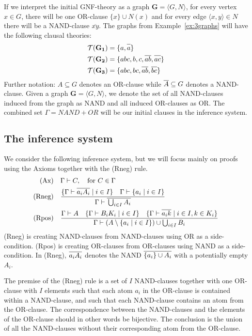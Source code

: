 If we interpret the initial GNF-theory as a graph $\mathbf{G}=\langle G,N\rangle$, for every vertex $x \in G$, there will be one OR-clause $\{ x \} \cup N(x)$ and for every edge $\langle x,y \rangle \in N$ there will be a NAND-clause $\overline{xy}$.
The graphs from Example~\ref{ex:3graphs} will have the following clausal theories:
\begin{align}
  \mathcal{T}(\mathbf{G_1}) &= \{ a, \ol{a} \}\\
  \mathcal{T}(\mathbf{G_2}) &= \{ abc, b, c, \ol{ab}, \ol{ac} \}\\
  \mathcal{T}(\mathbf{G_3}) &= \{ abc, bc, \ol{ab}, \ol{bc} \}
\end{align}
Further notation: $A\subseteq G$ denotes an OR-clause while $\ol{A} \subseteq G$ denotes a NAND-clause.
Given a graph $\mathbf{G}=\langle G,N\rangle$, we denote the set of all NAND-clauses induced from the graph as NAND and all induced OR-clauses as OR.
The combined set $\Gamma = NAND + OR$ will be our initial clauses in the inference system.
\subsection{The inference system}
\label{sub:The inference system}
We consider the following inference system, but we will focus mainly on proofs using the Axioms together with the (Rneg) rule.
\begin{align}
  \text{(Ax)} &\quad \Gamma \vdash C, \quad \text{for } C \in \Gamma\\
  \text{(Rneg)} &\quad \frac{ \{ \Gamma \vdash \ol{a_iA_i} \; |\; i \in I \} \quad \Gamma \vdash \{ a_i \; |\; i \in I \} }{ \Gamma \vdash \ol{\bigcup_{i \in I} A_i} }\\
  \text{(Rpos)} &\quad \frac{ \Gamma \vdash A \quad \{\Gamma \vdash B_iK_i \; |\; i \in I \} \quad \{ \Gamma \vdash \ol{a_ik} \; |\; i \in I, k \in K_i \} }{ \Gamma \vdash (A \setminus \{ a_i \; |\; i \in I \} ) \cup \bigcup_{i \in I} B_i }
\end{align}
(Rneg) is creating NAND-clauses from NAND-clauses using OR as a side-condition.
(Rpos) is creating OR-clauses from OR-clauses using NAND as a side-condition.
In (Rneg), $\ol{a_iA_i}$ denotes the NAND $\ol{\{ a_i \} \cup A_i}$ with a potentially empty $A_i$.

The premise of the (Rneg) rule is a set of $I$ NAND-clauses together with one OR-clause with $I$ elements such that each atom $a_i$ in the OR-clause is contained within a NAND-clause, and such that each NAND-clause contains an atom from the OR-clause.
The correspondence between the NAND-clauses and the elements of the OR-clause should in other words be bijective.
The conclusion is the union of all the NAND-clauses without their corresponding atom from the OR-clause.

